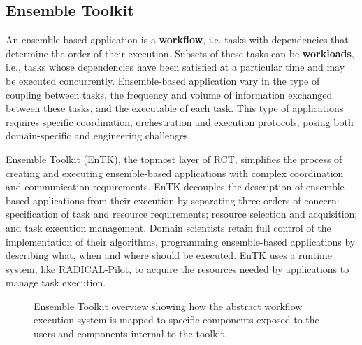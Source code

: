 \subsection{Ensemble Toolkit}\label{ssec:entk}

An ensemble-based application is a \textbf{workflow}, i.e. tasks
with dependencies that determine the order of their execution. Subsets of
these tasks can be \textbf{workloads}, i.e., tasks whose dependencies have
been satisfied at a particular time and may be executed concurrently.
Ensemble-based application vary in the type of coupling between tasks, the
frequency and volume of information exchanged between these tasks, and the
executable of each task. This type of applications requires specific
coordination, orchestration and execution protocols, posing both
domain-specific and engineering challenges.

Ensemble Toolkit (EnTK), the topmost layer of RCT, simplifies the process of
creating and executing ensemble-based applications with complex coordination
and communication requirements. EnTK decouples the description of
ensemble-based applications from their execution by separating three orders
of concern: specification of task and resource requirements; resource
selection and acquisition; and task execution management. Domain scientists
retain full control of the implementation of their algorithms, programming
ensemble-based applications by describing what, when and where should be
executed. EnTK uses a runtime system, like RADICAL-Pilot, to acquire the
resources needed by applications to manage task execution.

\begin{figure}[h!]
\caption{
  Ensemble Toolkit overview showing how the abstract
  workflow execution system is mapped to specific components exposed
  to the users and components internal to the toolkit.}
  \label{fig:entk_arch}
  \end{figure}


